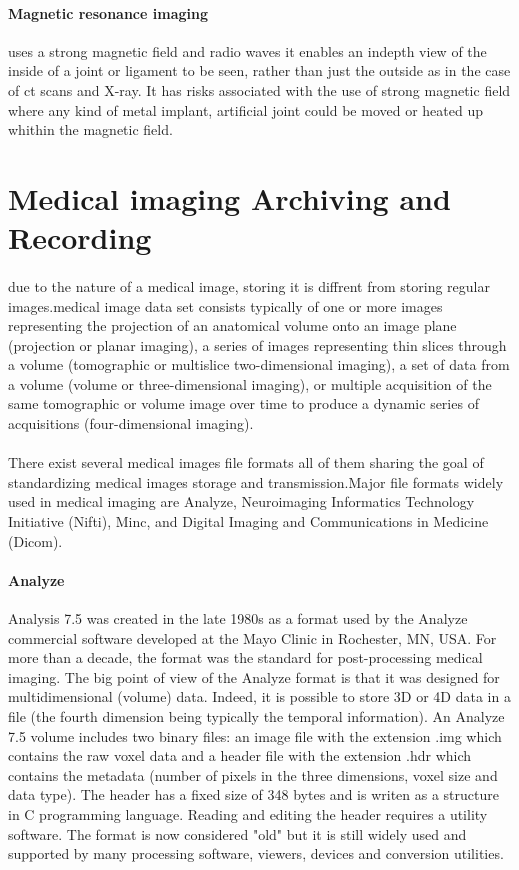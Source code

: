 \paragraph{Magnetic resonance imaging} uses a strong magnetic field and radio waves it enables an indepth view of the inside of a joint or ligament to be seen, rather than just the outside as in the case of \ac{ct} scans and X-ray. It has risks associated with the use of strong magnetic field where any kind of metal implant, artificial joint could be moved or heated up whithin the magnetic field.
\section{Medical imaging Archiving and Recording} 
\paragraph{}
due to the nature of a medical image, storing it is diffrent from storing regular images.medical image data set consists typically of one or more images representing the projection of an anatomical volume onto an image plane (projection or planar imaging), a series of images representing thin slices through a volume (tomographic or multislice two-dimensional imaging), a set of data from a volume (volume or three-dimensional imaging), or multiple acquisition of the same tomographic or volume image over time to produce a dynamic series of acquisitions (four-dimensional imaging).\cite{ME:1}
\paragraph{}
There exist several medical images file formats all of them sharing the goal of standardizing medical images storage and transmission.Major file formats widely used in medical imaging are Analyze, Neuroimaging Informatics Technology Initiative (Nifti), Minc, and Digital Imaging and Communications in Medicine (Dicom).
\paragraph{Analyze}
Analysis 7.5 was created in the late 1980s as a format used by the Analyze commercial software developed at the Mayo Clinic in Rochester, MN, USA. For more than a decade, the format was the standard for post-processing medical imaging. The big point of view of the Analyze format is that it was designed for multidimensional (volume) data. Indeed, it is possible to store 3D or 4D data in a file (the fourth dimension being typically the temporal information). An Analyze 7.5 volume includes two binary files: an image file with the extension .img which contains the raw voxel data and a header file with the extension .hdr which contains the metadata (number of pixels in the three dimensions, voxel size and data type). The header has a fixed size of 348 bytes and is writen as a structure in C programming language. Reading and editing the header requires a utility software. The format is now considered "old" but it is still widely used and supported by many processing software, viewers, devices and conversion utilities.\cite{ME:1}
